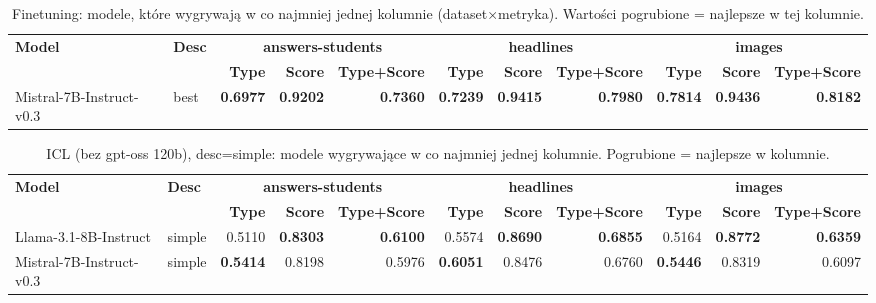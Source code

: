 

\begin{table}[t]
\centering
\scriptsize
\setlength{\tabcolsep}{3.5pt}
\begin{adjustbox}{width=\textwidth}
\begin{tabular}{l l r r r r r r r r r}
\hline
\textbf{Model} & \textbf{Desc} & \multicolumn{3}{c}{\textbf{answers-students}} & \multicolumn{3}{c}{\textbf{headlines}} & \multicolumn{3}{c}{\textbf{images}} \\
 &  & \textbf{Type} & \textbf{Score} & \textbf{Type+Score} & \textbf{Type} & \textbf{Score} & \textbf{Type+Score} & \textbf{Type} & \textbf{Score} & \textbf{Type+Score} \\
\hline
Mistral-7B-Instruct-v0.3 & best & \textbf{0.6977} & \textbf{0.9202} & \textbf{0.7360} & \textbf{0.7239} & \textbf{0.9415} & \textbf{0.7980} & \textbf{0.7814} & \textbf{0.9436} & \textbf{0.8182} \\
\hline
\end{tabular}
\end{adjustbox}
\caption{Finetuning: modele, które wygrywają w co najmniej jednej kolumnie (dataset×metryka). Wartości pogrubione = najlepsze w tej kolumnie.}
\end{table}

\begin{table}[t]
\centering
\scriptsize
\setlength{\tabcolsep}{3.5pt}
\begin{adjustbox}{width=\textwidth}
\begin{tabular}{l l r r r r r r r r r}
\hline
\textbf{Model} & \textbf{Desc} & \multicolumn{3}{c}{\textbf{answers-students}} & \multicolumn{3}{c}{\textbf{headlines}} & \multicolumn{3}{c}{\textbf{images}} \\
 &  & \textbf{Type} & \textbf{Score} & \textbf{Type+Score} & \textbf{Type} & \textbf{Score} & \textbf{Type+Score} & \textbf{Type} & \textbf{Score} & \textbf{Type+Score} \\
\hline
Llama-3.1-8B-Instruct & simple & 0.5110 & \textbf{0.8303} & \textbf{0.6100} & 0.5574 & \textbf{0.8690} & \textbf{0.6855} & 0.5164 & \textbf{0.8772} & \textbf{0.6359} \\
Mistral-7B-Instruct-v0.3 & simple & \textbf{0.5414} & 0.8198 & 0.5976 & \textbf{0.6051} & 0.8476 & 0.6760 & \textbf{0.5446} & 0.8319 & 0.6097 \\
\hline
\end{tabular}
\end{adjustbox}
\caption{ICL (bez gpt-oss 120b), desc=simple: modele wygrywające w co najmniej jednej kolumnie. Pogrubione = najlepsze w kolumnie.}
\end{table}

